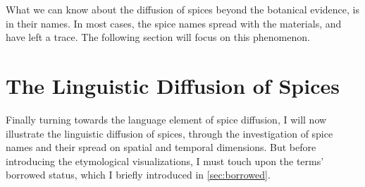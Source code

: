 What we can know about the diffusion of spices beyond the botanical evidence, is in their names. In most cases, the spice names spread with the materials, and have left a trace. The following section will focus on this phenomenon.

\section{The Linguistic Diffusion of Spices}

Finally turning towards the language element of spice diffusion, I will now illustrate the linguistic diffusion of spices, through the investigation of spice names and their spread on spatial and temporal dimensions. But before introducing the etymological visualizations, I must touch upon the terms' borrowed status, which I briefly introduced in \cref{sec:borrowed}. 


